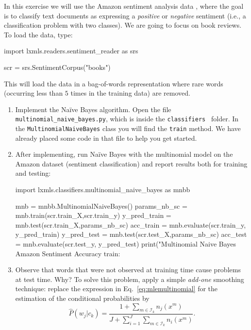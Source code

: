 \begin{exercise}
In this exercise we will use the Amazon sentiment analysis data \citep{blitzer2007biographies}, 
where the goal is to classify text documents as expressing a \emph{positive} or \emph{negative} sentiment 
(i.e., a classification problem with two classes). We are going to focus on book reviews. 
To load the data, type:
\begin{python}
import lxmls.readers.sentiment_reader as srs

scr = srs.SentimentCorpus("books")
\end{python}
This will load the data in a bag-of-words representation where rare words (occurring less than $5$ times in the training data) are removed. 

\begin{enumerate}
\item Implement the Na\"{i}ve Bayes algorithm. Open the file {\tt multinomial\_naive\_bayes.py}, which is inside the  {\tt classifiers } folder. In the {\tt MultinomialNaiveBayes} class you will find the {\tt train} method. We have already placed some code in that file to help you get started.

\item After implementing, run Na\"ive Bayes with the multinomial model on the Amazon
  dataset (sentiment classification) and report results both for
  training and testing: 
    
\begin{python}
import lxmls.classifiers.multinomial_naive_bayes as mnbb

mnb = mnbb.MultinomialNaiveBayes()
params_nb_sc = mnb.train(scr.train_X,scr.train_y)
y_pred_train = mnb.test(scr.train_X,params_nb_sc)
acc_train = mnb.evaluate(scr.train_y, y_pred_train)
y_pred_test = mnb.test(scr.test_X,params_nb_sc)
acc_test = mnb.evaluate(scr.test_y, y_pred_test)
print("Multinomial Naive Bayes Amazon Sentiment Accuracy train: %
\end{python}


\item Observe that words that were not observed at training time cause problems at test time. Why?
To solve this problem, apply a simple \emph{add-one} smoothing technique: replace the expression in Eq.~\ref{eq:mlemultinomial} 
for the estimation of the conditional probabilities 
by
$${\hat P}(w_j|c_k) = \frac{1+\sum_ {m \in \mathcal{I}_k} n_j(x^m)}{J + \sum_{i=1}^J \sum_ {m\in \mathcal{I}_k} n_i(x^m)}.$$



\end{enumerate}
\end{exercise}

